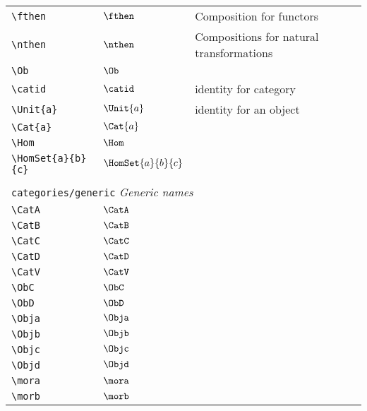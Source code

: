 \begin{longtable}{lll}
 {\color[rgb]{0.5,0.5,0.5}\texttt{\textbackslash fthen}} & $\fthen$ &  Composition for functors\\ 
 {\color[rgb]{0.5,0.5,0.5}\texttt{\textbackslash nthen}} & $\nthen$ &  Compositions for natural transformations\\ 
 {\color[rgb]{0.5,0.5,0.5}\texttt{\textbackslash Ob}} & $\Ob$ & \\ 
 {\color[rgb]{0.5,0.5,0.5}\texttt{\textbackslash catid}} & $\catid$ &  identity for category\\ 
 {\color[rgb]{0.5,0.5,0.5}\texttt{\textbackslash Unit\{a\}}} & $\Unit{a}$ &  identity for an object\\ 
 {\color[rgb]{0.5,0.5,0.5}\texttt{\textbackslash Cat\{a\}}} & $\Cat{a}$ & \\ 
 {\color[rgb]{0.5,0.5,0.5}\texttt{\textbackslash Hom}} & $\Hom$ & \\ 
 {\color[rgb]{0.5,0.5,0.5}\texttt{\textbackslash HomSet\{a\}\{b\}\{c\}}} & $\HomSet{a}{b}{c}$ & \\ 
  &  & \\ 
 \multicolumn{3}{l}{{\color[rgb]{0.5,0.5,0.5}\texttt{categories/generic}} \emph{Generic names}}\\ 
 \hline
{\color[rgb]{0.5,0.5,0.5}\texttt{\textbackslash CatA}} & $\CatA$ & \\ 
 {\color[rgb]{0.5,0.5,0.5}\texttt{\textbackslash CatB}} & $\CatB$ & \\ 
 {\color[rgb]{0.5,0.5,0.5}\texttt{\textbackslash CatC}} & $\CatC$ & \\ 
 {\color[rgb]{0.5,0.5,0.5}\texttt{\textbackslash CatD}} & $\CatD$ & \\ 
 {\color[rgb]{0.5,0.5,0.5}\texttt{\textbackslash CatV}} & $\CatV$ & \\ 
 {\color[rgb]{0.5,0.5,0.5}\texttt{\textbackslash ObC}} & $\ObC$ & \\ 
 {\color[rgb]{0.5,0.5,0.5}\texttt{\textbackslash ObD}} & $\ObD$ & \\ 
 {\color[rgb]{0.5,0.5,0.5}\texttt{\textbackslash Obja}} & $\Obja$ & \\ 
 {\color[rgb]{0.5,0.5,0.5}\texttt{\textbackslash Objb}} & $\Objb$ & \\ 
 {\color[rgb]{0.5,0.5,0.5}\texttt{\textbackslash Objc}} & $\Objc$ & \\ 
 {\color[rgb]{0.5,0.5,0.5}\texttt{\textbackslash Objd}} & $\Objd$ & \\ 
 {\color[rgb]{0.5,0.5,0.5}\texttt{\textbackslash mora}} & $\mora$ & \\ 
 {\color[rgb]{0.5,0.5,0.5}\texttt{\textbackslash morb}} & $\morb$ & \\ 

\end{longtable}
